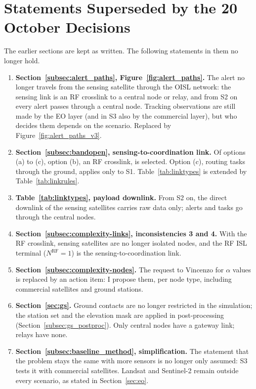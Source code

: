 \documentclass[11pt]{article}
\begin{document}
\section{Statements Superseded by the 20 October Decisions}\label{sec:superseded}

The earlier sections are kept as written. The following statements in them no longer hold.

\begin{enumerate}[leftmargin=1.2cm]
    \item \textbf{Section~\ref{subsec:alert_paths}, Figure~\ref{fig:alert_paths}.} The alert no longer travels from the sensing satellite through the OISL network: the sensing link is an RF crosslink to a central node or relay, and from S2 on every alert passes through a central node. Tracking observations are still made by the EO layer (and in S3 also by the commercial layer), but who decides them depends on the scenario. Replaced by Figure~\ref{fig:alert_paths_v3}.
    \item \textbf{Section~\ref{subsec:bandopen}, sensing-to-coordination link.} Of options (a) to (c), option (b), an RF crosslink, is selected. Option (c), routing tasks through the ground, applies only to S1. Table~\ref{tab:linktypes} is extended by Table~\ref{tab:linkrules}.
    \item \textbf{Table~\ref{tab:linktypes}, payload downlink.} From S2 on, the direct downlink of the sensing satellites carries raw data only; alerts and tasks go through the central nodes.
    \item \textbf{Section~\ref{subsec:complexity-links}, inconsistencies 3 and 4.} With the RF crosslink, sensing satellites are no longer isolated nodes, and the RF ISL terminal ($N^{\mathrm{RF}} = 1$) is the sensing-to-coordination link.
    \item \textbf{Section~\ref{subsec:complexity-nodes}.} The request to Vincenzo for $\alpha$ values is replaced by an action item: I propose them, per node type, including commercial satellites and ground stations.
    \item \textbf{Section~\ref{sec:gs}.} Ground contacts are no longer restricted in the simulation; the station set and the elevation mask are applied in post-processing (Section~\ref{subsec:gs_postproc}). Only central nodes have a gateway link; relays have none.
    \item \textbf{Section~\ref{subsec:baseline_method}, simplification.} The statement that the problem stays the same with more sensors is no longer only assumed: S3 tests it with commercial satellites. Landsat and Sentinel-2 remain outside every scenario, as stated in Section~\ref{sec:eo}.
\end{enumerate}
\end{document}
